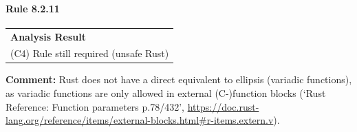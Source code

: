 \paragraph{Rule 8.2.11}
\begin{longtable}{p{13cm}}
\textbf{Analysis Result} \\
(C4) Rule still required (unsafe Rust) \\
\end{longtable}
\textbf{Comment:} Rust does not have a direct equivalent to ellipsis (variadic functions), as variadic functions are only allowed in external (C-)function blocks (`Rust Reference: Function parameters p.78/432', \url{https://doc.rust-lang.org/reference/items/external-blocks.html#r-items.extern.v}). \\
